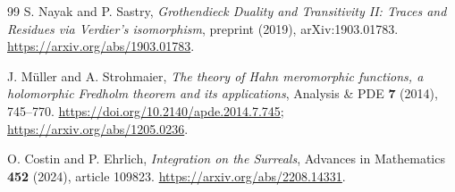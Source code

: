 \documentclass[11pt,letterpaper]{article}
\theoremstyle{definition}
\theoremstyle{remark}
\begin{document}
\begin{thebibliography}{99}
S. Nayak and P. Sastry,
\emph{Grothendieck Duality and Transitivity II: Traces and Residues via Verdier's isomorphism},
preprint (2019), arXiv:1903.01783.
\url{https://arxiv.org/abs/1903.01783}.

J. M\"uller and A. Strohmaier,
\emph{The theory of Hahn meromorphic functions, a holomorphic Fredholm theorem and its applications},
Analysis \& PDE \textbf{7} (2014), 745--770.
\url{https://doi.org/10.2140/apde.2014.7.745};
\url{https://arxiv.org/abs/1205.0236}.

O. Costin and P. Ehrlich, \emph{Integration on the Surreals},
Advances in Mathematics \textbf{452} (2024), article 109823.
\url{https://arxiv.org/abs/2208.14331}.

\end{thebibliography}
\endgroup
\end{document}
